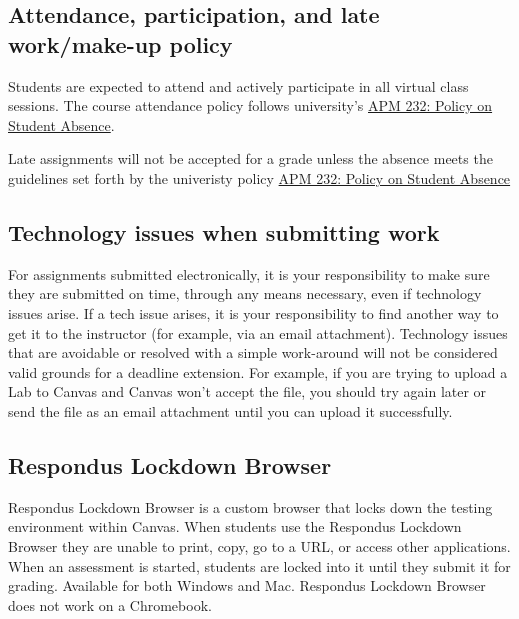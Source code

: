 \hypertarget{attendance-participation-and-late-workmake-up-policy}{%
\subsection{Attendance, participation, and late work/make-up
policy}\label{attendance-participation-and-late-workmake-up-policy}}

Students are expected to attend and actively participate in all virtual
class sessions. The course attendance policy follows university's
\href{http://www.fresnostate.edu/academics/facultyaffairs/documents/apm/232.pdf}{APM
232: Policy on Student Absence}.

Late assignments will not be accepted for a grade unless the absence
meets the guidelines set forth by the univeristy policy
\href{http://www.fresnostate.edu/academics/facultyaffairs/documents/apm/232.pdf}{APM
232: Policy on Student Absence}

\hypertarget{technology-issues-when-submitting-work}{%
\subsection{Technology issues when submitting
work}\label{technology-issues-when-submitting-work}}

For assignments submitted electronically, it is your responsibility to
make sure they are submitted on time, through any means necessary, even
if technology issues arise. If a tech issue arises, it is your
responsibility to find another way to get it to the instructor (for
example, via an email attachment). Technology issues that are avoidable
or resolved with a simple work-around will not be considered valid
grounds for a deadline extension. For example, if you are trying to
upload a Lab to Canvas and Canvas won't accept the file, you should try
again later or send the file as an email attachment until you can upload
it successfully.

\hypertarget{respondus-lockdown-browser}{%
\subsection{Respondus Lockdown
Browser}\label{respondus-lockdown-browser}}

Respondus Lockdown Browser is a custom browser that locks down the
testing environment within Canvas. When students use the Respondus
Lockdown Browser they are unable to print, copy, go to a URL, or access
other applications. When an assessment is started, students are locked
into it until they submit it for grading. Available for both Windows and
Mac. Respondus Lockdown Browser does not work on a Chromebook.

